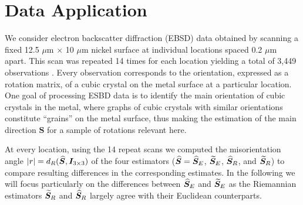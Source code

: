 \section{Data Application}\label{sec:data}

We consider electron backscatter diffraction (EBSD) data obtained by scanning a fixed  12.5 $\mu$m $\times$ 10 $\mu$m nickel surface at individual locations spaced 0.2 $\mu$m apart. This scan was repeated 14 times for each location yielding a total of 3,449 observations \citep{bingham09, bingham10b}. Every observation corresponds to the orientation, expressed as a rotation matrix, of a cubic crystal on the metal surface at a particular location. One goal of processing ESBD data is to identify the main orientation of cubic crystals in the metal, where graphs of cubic crystals with similar orientations constitute ``grains'' on the metal surface, thus making the estimation of the main direction $\bm S$ for a sample of rotations relevant here.

At every location, using the 14 repeat scans  we computed the misorientation angle $|r|={d_R}(\widehat{\bm{S}}, \bm I_{3\times 3})$ of the four estimators ($\widehat{\bm{S}}= {\widehat{\bm S}_E}$, ${\widetilde{\bm S}_E}$, ${\widehat{\bm S}_R}$, and ${\widetilde{\bm S}_R}$) to compare resulting differences in the corresponding estimates.  In the following we will focus particularly on the differences between ${\widehat{\bm S}_E}$ and ${\widetilde{\bm S}_E}$ as the Riemannian estimators  ${\widetilde{\bm S}_R}$ and ${\widehat{\bm S}_R}$ largely agree with their Euclidean counterparts. 

